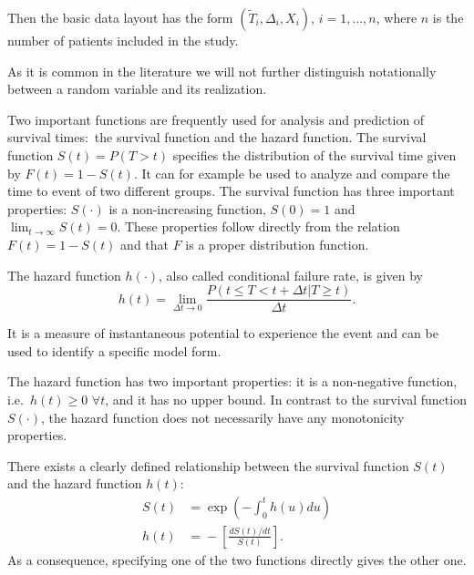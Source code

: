 \documentclass[12pt, a4paper]{scrartcl}
\theoremstyle{definition}
\theoremstyle{plain}
\numberwithin{equation}{section}
\numberwithin{figure}{section}
\numberwithin{table}{section}
\begin{document}
	Then the basic data layout has the form $(\tilde{T}_i, \Delta_i, X_i)$, $i = 1, \dots , n$, where $n$ is the number of patients included in the study.
	
	As it is common in the literature we will not further distinguish notationally between a random variable and its realization.
	
	
	Two important functions are frequently used for analysis and prediction of survival times:~the survival function and the hazard function.
	The survival function $S(t) = P(T > t)$ specifies the distribution of the survival time given by $F(t) = 1 - S(t)$.
	It can for example be used to analyze and compare the time to event of two different groups.
	The survival function has three important properties: $S(\cdot)$ is a non-increasing function, $S(0)=1$ and $\lim_{t \to \infty} S(t)=0$.
	These properties follow directly from the relation $F(t)=1-S(t)$ and that $F$ is a proper distribution function.
	
	The hazard function $h(\cdot)$, also called conditional failure rate, is given by
	\begin{equation*}
		h(t) = \lim_{\Delta t \to 0}\frac{P(t \leq T < t + \Delta t \vert T \geq t)}{\Delta t}.
	\end{equation*} 
	
	It is a measure of instantaneous potential to experience the event and can be used to identify a specific model form.
	
	The hazard function has two important properties: it is a non-negative function, i.e.~$h(t) \geq 0$ $ \forall t$, and it has no upper bound.
	In contrast to the survival function $S(\cdot)$, the hazard function does not necessarily have any monotonicity properties.

	There exists a clearly defined relationship between the survival function $S(t)$ and the hazard function $h(t)$:
	\begin{equation*}
	\begin{split}
		S(t) &={} \exp \left( - \int_{0}^{t}h(u)du\right) \\
		h(t) & ={} - \left[ \frac{dS(t)/dt}{S(t)}\right].
	\end{split}
	\end{equation*}
	As a consequence, specifying one of the two functions directly gives the other one.
	
	
\end{document}
